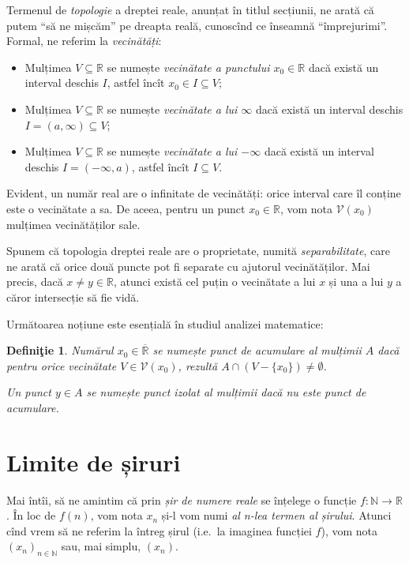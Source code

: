 \documentclass[11pt,a4paper]{article}
\newcommand\qq{\enquote}
\newcommand\kal{\mathcal}
\newcommand\seq{\subseteq}
\newcommand\vid{\emptyset}
\newcommand\NN{\mathbb{N}}
\newcommand\RR{\mathbb{R}}
\theoremstyle{dotless}
\theoremstyle{dotlessdr}
\newtheorem{definition}{Defini\c{t}ie}[section]
\begin{document}
Termenul de \emph{topologie} a dreptei reale, anunțat în titlul secțiunii, ne arată
că putem \qq{să ne mișcăm} pe dreapta reală, cunoscînd ce înseamnă \qq{împrejurimi}.
Formal, ne referim la \emph{vecinătăți}:

\begin{itemize}
  \item Mulțimea $V \seq \RR$ se numește \emph{vecinătate a punctului $x_0 \in \RR$}
    dacă există un interval deschis $I$, astfel încît $x_0 \in I \seq V$;
  \item Mulțimea $V \seq \RR$ se numește \emph{vecinătate a lui $\infty$} dacă există
    un interval deschis $I = (a, \infty) \seq V$;
  \item Mulțimea $V \seq \RR$ se numește \emph{vecinătate a lui $-\infty$} dacă există
    un interval deschis $I = (-\infty, a)$, astfel încît $I \seq V$.
\end{itemize}

Evident, un număr real are o infinitate de vecinătăți: orice interval care îl conține
este o vecinătate a sa. De aceea, pentru un punct $x_0 \in \RR$, vom nota $\kal{V}(x_0)$
mulțimea vecinătăților sale.

Spunem că topologia dreptei reale are o proprietate, numită \emph{separabilitate}, care
ne arată că orice două puncte pot fi separate cu ajutorul vecinătăților. Mai precis,
dacă $x \neq y \in \RR$, atunci există cel puțin o vecinătate a lui $x$ și una a lui $y$
a căror intersecție să fie vidă.

Următoarea noțiune este esențială în studiul analizei matematice:

\begin{definition}\label{def:acumulare}
  Numărul $x_0 \in \overline{\RR}$ se numește \emph{punct de acumulare} al mulțimii $A$
  dacă pentru orice vecinătate $V \in \kal{V}(x_0)$, rezultă $A \cap (V - \{x_0\}) \neq \vid$.

  Un punct $y \in A$ se numește \emph{punct izolat} al mulțimii dacă nu este punct de
  acumulare.
\end{definition}


\section{Limite de șiruri}
\label{sec:limite-siruri}

\indent\indent Mai întîi, să ne amintim că prin \emph{șir de numere reale} se înțelege
o funcție $f : \NN \to \RR$. În loc de $f(n)$, vom nota $x_n$ și-l vom numi \emph{al %
  n-lea termen al șirului}. Atunci cînd vrem să ne referim la întreg șirul (i.e.\ la
imaginea funcției $f$), vom nota $(x_n)_{n \in \NN}$ sau, mai simplu, $(x_n)$.
\end{document}
